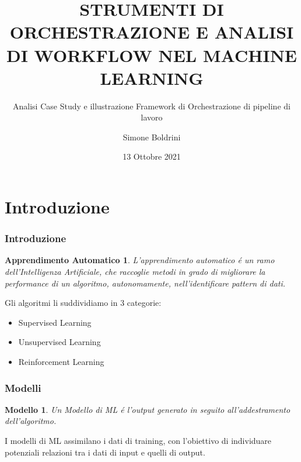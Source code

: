 \documentclass[xcolor=dvipsnames]{beamer}
\title{STRUMENTI DI ORCHESTRAZIONE E ANALISI DI WORKFLOW NEL MACHINE LEARNING}
\subtitle[]{Analisi Case Study e illustrazione Framework di Orchestrazione di pipeline di lavoro}
\author{Simone Boldrini}
\date{13 Ottobre 2021}
\institute[]{Alma Mater Studiorum - Universitá di Bologna \\ Facoltá di Scienze}
\begin{document}
\maketitle


\section{Introduzione}
\begin{frame}
    \frametitle{Introduzione}
    
    \newtheorem{Apprendimento Automatico}{Apprendimento Automatico}

    \begin{Apprendimento Automatico}
        L'\alert{apprendimento automatico} é un ramo dell'Intelligenza Artificiale, che raccoglie metodi in grado di migliorare la performance di un algoritmo, autonomamente, nell'identificare pattern di dati.
    \end{Apprendimento Automatico}
    Gli algoritmi li suddividiamo in 3 categorie:
    \begin{itemize}
        \item Supervised Learning
        \item Unsupervised Learning
        \item Reinforcement Learning
    \end{itemize}
\end{frame}
\begin{frame}
 \frametitle{Modelli} 
 \newtheorem{Modello}{Modello}
 \begin{Modello}
Un Modello di ML é l'output generato in seguito all'addestramento dell'algoritmo.
 \end{Modello}  
 I modelli di ML assimilano i dati di training, con l'obiettivo di individuare potenziali relazioni tra i dati di input e quelli di output.
\end{frame}
\end{document}
